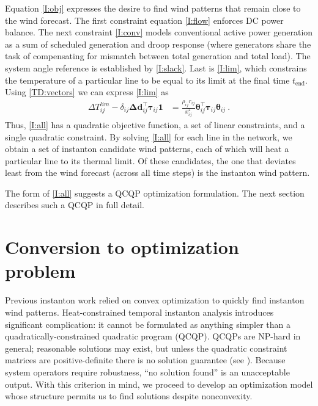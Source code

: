 \documentclass[conference]{IEEEtran}
\begin{document}
Equation \eqref{I:obj} expresses the desire to find wind patterns that remain close to the wind forecast. The first constraint equation \eqref{I:flow} enforces DC power balance. The next constraint \eqref{I:conv} models conventional active power generation as a sum of
scheduled generation and droop response (where generators share the task of compensating for mismatch between total generation and total load). The system angle reference is established by \eqref{I:slack}. Last is \eqref{I:lim}, which constrains the temperature of a particular line to be equal to its limit at the final time $t_\text{end}$. Using \eqref{TD:vectors} we can express \eqref{I:lim} as
\begin{align}\label{temp}
\Delta T_{ij}^{lim} - \delta_{ij} \boldsymbol{\Delta d}_{ij}^\top \boldsymbol{\tau}_{ij}\mathbf{1}   &= \frac{\rho_{ij}r_{ij}}{x_{ij}^2} \boldsymbol{\theta}_{ij}^\top \boldsymbol{\tau}_{ij} \boldsymbol{\theta}_{ij}~.
\end{align}
Thus, \eqref{I:all} has a quadratic objective function, a set of linear constraints, and a single quadratic constraint. By solving \eqref{I:all} for each line in the network, we obtain a set of instanton candidate wind patterns, each of which will heat a particular line to its thermal limit. Of these candidates, the one that deviates least from the wind forecast (across all time steps) is the instanton wind pattern.

The form of \eqref{I:all} suggests a QCQP optimization formulation. The next section describes such a QCQP in full detail.

\section{Conversion to optimization problem}\label{sec:optimization}
Previous instanton work relied on convex optimization to quickly find instanton wind patterns. Heat-constrained temporal instanton analysis introduces significant complication:  it cannot be formulated as anything simpler than a quadratically-constrained quadratic program (QCQP). QCQPs are NP-hard in general; reasonable solutions may exist, but unless the quadratic constraint matrices are positive-definite there is no solution guarantee (see \cite{mehanna2014}). Because system operators require robustness, ``no solution found'' is an unacceptable output. With this criterion in mind, we proceed to develop an optimization model whose structure permits us to find solutions despite nonconvexity.
\end{document}
